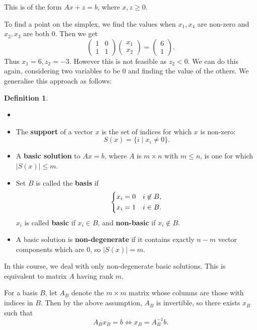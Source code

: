 \documentclass[12pt]{article}
\theoremstyle{definition}
\newtheorem{definition}{Definition}[section]
\theoremstyle{remark}
\begin{document}
This is of the form $Ax + z = b$, where $x, z \geq 0$.

To find a point on the simplex, we find the values when $x_1, x_4$ are non-zero and $x_2, x_3$ are both 0. Then we get
\[
\begin{pmatrix}
	1 & 0 \\
	1 & 1
\end{pmatrix}
\begin{pmatrix}
	x_1 \\
	x_2
\end{pmatrix}
=
\begin{pmatrix}
	6 \\
	1
\end{pmatrix}
.\]
Thus $x_1 = 6, z_2 = -3$. However this is not feasible as $z_2 < 0$. We can do this again, considering two variables to be $0$ and finding the value of the others. We generalise this approach as follows:

\begin{definition}
	\begin{itemize}
		\item[]
		\item The \textbf{support} of a vector $x$ is the set of indices for which $x$ is non-zero:
			\[
				S(x) = \{i \mid x_i \neq 0\}
			.\]
		\item A \textbf{basic solution} to $Ax = b$, where $A$ is $m \times n$ with $m \leq n$, is one for which $|S(x)| \leq m$.
		\item Set $B$ is called the \textbf{basis} if
			\[
			\begin{dcases}
				x_i = 0 & i \not \in B, \\
				x_i = 1 & i \in B.
			\end{dcases}
			\]
			$x_i$ is called \textbf{basic} if $x_i \in B$, and \textbf{non-basic} if $x_i \not \in B$.
		\item A basic solution is \textbf{non-degenerate} if it contains exactly $n - m$ vector components which are $0$, so $|S(x)| = m$.
	\end{itemize}
	
\end{definition}

In this course, we deal with only non-degenerate basic solutions. This is equivalent to matrix $A$ having rank $m$.

For a basis $B$, let $A_{B}$ denote the $m \times m$ matrix whose columns are those with indices in $B$. Then by the above assumption, $A_{B}$ is invertible, so there exists $x_B$ such that
\[
A_Bx_B = b \iff x_B = A_B^{-1}b
.\]
\end{document}
